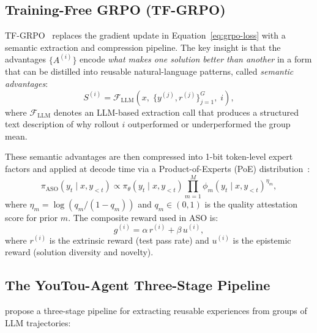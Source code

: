 \documentclass[11pt]{article}
\begin{document}
\subsection{Training-Free GRPO (TF-GRPO)}

TF-GRPO~\cite{hanzo2026aso} replaces the gradient update in
Equation~\eqref{eq:grpo-loss} with a semantic extraction and compression
pipeline. The key insight is that the advantages $\{A^{(i)}\}$ encode
\emph{what makes one solution better than another} in a form that can be
distilled into reusable natural-language patterns, called \emph{semantic
advantages}:
\begin{equation}
    S^{(i)} = \mathcal{F}_{\text{LLM}}\!\left(x,\;\{y^{(j)}, r^{(j)}\}_{j=1}^G,\; i\right),
    \label{eq:semantic-advantage}
\end{equation}
where $\mathcal{F}_{\text{LLM}}$ denotes an LLM-based extraction call that
produces a structured text description of why rollout $i$ outperformed or
underperformed the group mean.

These semantic advantages are then compressed into 1-bit token-level expert
factors and applied at decode time via a Product-of-Experts (PoE)
distribution~\cite{hinton2002training}:
\begin{equation}
    \pi_{\text{ASO}}(y_t \mid x, y_{<t}) \propto \pi_\theta(y_t \mid x, y_{<t})
    \prod_{m=1}^{M} \phi_m(y_t \mid x, y_{<t})^{\eta_m},
    \label{eq:poe}
\end{equation}
where $\eta_m = \log(q_m / (1 - q_m))$ and $q_m \in (0,1)$ is the quality
attestation score for prior $m$. The composite reward used in ASO is:
\begin{equation}
    g^{(i)} = \alpha\, r^{(i)} + \beta\, u^{(i)},
    \label{eq:aso-reward}
\end{equation}
where $r^{(i)}$ is the extrinsic reward (test pass rate) and $u^{(i)}$ is the
epistemic reward (solution diversity and novelty).

\subsection{The YouTou-Agent Three-Stage Pipeline}

\cite{tencent2025youtoagent} propose a three-stage pipeline for extracting
reusable experiences from groups of LLM trajectories:
\end{document}
